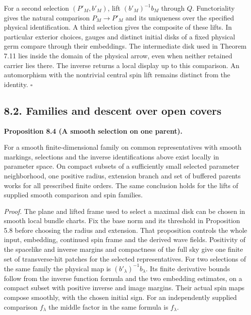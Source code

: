 \documentclass[
  english,
  11pt,
  reqno]{amsart}
\makeatletter
\newcommand{\paperdisplaynext}{%
  \let\paper@savedstartsection\@startsection
  \def\@startsection##1##2##3##4##5##6{%
    \let\@startsection\paper@savedstartsection
    \@tempskipa ##5\relax
    \ifdim\@tempskipa<\z@
      \def\paper@afterskip{.35\baselineskip}%
    \else
      \def\paper@afterskip{##5}%
    \fi
    \@startsection{##1}{##2}{##3}{##4}{\paper@afterskip}{##6}}}
\newcommand{\paperdisplaysection}{\paperdisplaynext\subsection}
\newcommand{\pandocstatementheading}[1]{%
  \par\if@nobreak\else
    \addpenalty{\@beginparpenalty}%
    \addvspace{.5\baselineskip plus .2\baselineskip minus .2\baselineskip}%
  \fi
  {\normalfont\bfseries #1\par}%
  \nobreak\@afterindenttrue\@afterheading
}
\let\paper@displaysection\paperdisplaysection
\renewcommand{\paperdisplaysection}[1]{%
  \let\paper@savedhangfrom\@hangfrom
  \long\def\@hangfrom##1##2{%
    \paper@savedhangfrom{##1}{\paper@headingparagraph##2}}%
  \paper@displaysection{#1}%
  \let\@hangfrom\paper@savedhangfrom}
\makeatother
\begin{document}
For a second selection \((P'_M,b'_M)\), lift \((b'_M)^{-1}b_M\) through
\(Q\). Functoriality gives the natural comparison \(P_M\to P'_M\) and
its uniqueness over the specified physical identification. A third
selection gives the composite of these lifts. In particular exterior
choices, gauges and distinct initial disks of a fixed physical germ
compare through their embeddings. The intermediate disk used in Theorem
7.11 lies inside the domain of the physical arrow, even when neither
retained carrier lies there. The inverse returns a local display up to
this comparison. An automorphism with the nontrivial central spin lift
remains distinct from the identity. \hfill\(\square\)

\paperdisplaysection{8.2. Families and descent over open
covers}\label{families-and-descent-over-open-covers}\label{sec:families-and-descent}

\pandocstatementheading{\leavevmode{}\label{prop:local-inverse-families}Proposition 8.4 (A smooth selection on one parent).}

For a smooth finite-dimensional family on common representatives with
smooth markings, selections and the inverse identifications above exist
locally in parameter space. On compact subsets of a sufficiently small
selected parameter neighborhood, one positive radius, extension branch
and set of buffered parents works for all prescribed finite orders. The
same conclusion holds for the lifts of supplied smooth comparison and
spin families.

\emph{Proof.} The plane and lifted frame used to select a maximal disk
can be chosen in smooth local bundle charts. Fix the base norm and its
threshold in Proposition 5.8 before choosing the radius and extension.
That proposition controls the whole input, embedding, continued spin
frame and the derived wave fields. Positivity of the spacelike and
inverse margins and compactness of the full sky give one finite set of
transverse-hit patches for the selected representatives. For two
selections of the same family the physical map is
\((b'_\lambda)^{-1}b_\lambda\). Its finite derivative bounds follow from
the inverse function formula and the two embedding estimates, on a
compact subset with positive inverse and image margins. Their actual
spin maps compose smoothly, with the chosen initial sign. For an
independently supplied comparison \(f_\lambda\) the middle factor in the
same formula is \(f_\lambda\).
\end{document}
